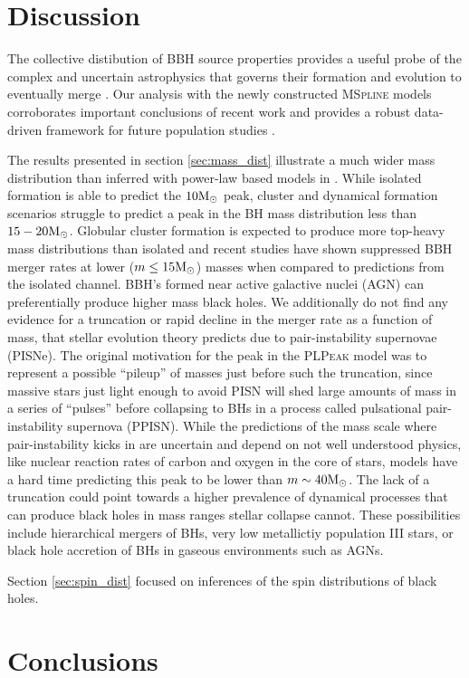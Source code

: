 \section{Discussion}\label{sec:astrodiscussion}

The collective distibution of BBH source properties provides a useful probe of the complex and uncertain astrophysics that governs their 
formation and evolution to eventually merge . Our analysis with the newly constructed \textsc{MSpline} models corroborates important 
conclusions of recent work and provides a robust data-driven framework for future population studies . 

The results presented in section \ref{sec:mass_dist} illustrate a much wider mass distribution than inferred with power-law based models in \citet{o3b_astro_dist}. 
While isolated formation is able to predict the $10{\rm M}_\odot$ peak, cluster and dynamical formation scenarios struggle to predict a peak in the BH mass distribution less than 
$15-20{\rm M}_\odot$. Globular cluster formation is expected to produce more top-heavy mass distributions than isolated and recent studies have shown suppressed BBH merger rates 
at lower ($m\leq15{\rm M}_\odot$) masses when compared to predictions from the isolated channel. BBH's formed near active galactive nuclei (AGN) can preferentially produce higher 
mass black holes. We additionally do not find any evidence for a truncation or rapid decline in the merger rate as a function of mass, that stellar evolution theory predicts 
due to pair-instability supernovae (PISNe). The original motivation for the peak in the \textsc{PLPeak} model was to represent a possible ``pileup'' of masses just before such the 
truncation, since massive stars just light enough to avoid PISN will shed large amounts of mass in a series of ``pulses'' before collapsing to BHs in a process called 
pulsational pair-instability supernova (PPISN). While the predictions of the mass scale where pair-instability kicks in are uncertain and depend on not well understood physics, 
like nuclear reaction rates of carbon and oxygen in the core of stars, models have a hard time predicting this peak to be lower than $m\sim40{\rm M}_\odot$. The lack of a truncation could 
point towards a higher prevalence of dynamical processes that can produce black holes in mass ranges stellar collapse cannot. These possibilities include hierarchical mergers of BHs, 
very low metallictiy population III stars, or black hole accretion of BHs in gaseous environments such as AGNs. 

Section \ref{sec:spin_dist} focused on inferences of the spin distributions of black holes.


\section{Conclusions}\label{sec:conclusion}

